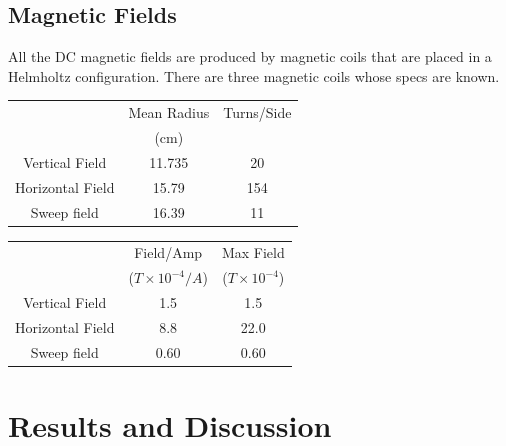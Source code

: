 \documentclass[twocolumn]{article}
\begin{document}
\subsection{Magnetic Fields}
All the DC magnetic fields are produced by magnetic coils that are placed in a 
Helmholtz configuration. There are three magnetic coils whose specs are known.
\begin{minipage}[t]{\linewidth}
\center
\begin{tabular}{|c|c|c|}
\hline
{} & Mean Radius & Turns/Side \\ {} & (cm) & {} \\ \hline
Vertical Field & 11.735 & 20 \\ \hline
Horizontal Field & 15.79 & 154 \\ \hline
Sweep field & 16.39 & 11 \\ \hline
\end{tabular}
\label{tbl:2}
\begin{tabular}{|c|c|c|}
\hline
{} & Field/Amp & Max Field \\ 
{} & ($T\times10^{-4}/A$) & ($T\times10^{-4}$) \\ \hline
Vertical Field & 1.5 & 1.5 \\ \hline
Horizontal Field & 8.8 & 22.0 \\ \hline
Sweep field & 0.60 & 0.60 \\ \hline
\end{tabular}
\label{tbl:3}
\end{minipage}

\section{Results and Discussion}
\end{document}
